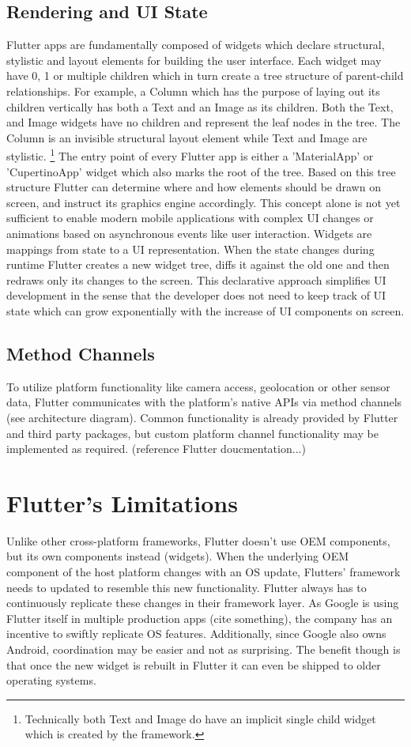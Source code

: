 \subsection{Rendering and UI State}
Flutter apps are fundamentally composed of widgets which declare structural, stylistic and layout elements for building the user interface. 
Each widget may have 0, 1 or multiple children which in turn create a tree structure of parent-child relationships. 
For example, a Column which has the purpose of laying out its children vertically has both a Text and an Image as its children. Both the Text,
and Image widgets have no children and represent the leaf nodes in the tree. The Column is an invisible structural layout element while Text and 
Image are stylistic.
\footnote{Technically both Text and Image do have an implicit single child widget which is created by the framework.}
The entry point of every Flutter app is either a 'MaterialApp' or 'CupertinoApp' widget which also marks the root of the tree.
Based on this tree structure Flutter can determine where and how elements should be drawn on screen, and instruct its graphics engine accordingly.
This concept alone is not yet sufficient to enable modern mobile applications with complex UI changes or animations 
based on asynchronous events like user interaction. 
Widgets are mappings from state to a UI representation. When the state changes during runtime Flutter creates a new widget tree, 
diffs it against the old one and then redraws only its changes to the screen.
This declarative approach simplifies UI development in the sense that the developer does not need to keep track of UI state which can grow exponentially
with the increase of UI components on screen. 

\subsection{Method Channels}
To utilize platform functionality like camera access, geolocation or other sensor data, Flutter communicates with the platform's native APIs via 
method channels (see architecture diagram). Common functionality is already provided by Flutter and third party packages, but custom platform channel
functionality may be implemented as required. (reference Flutter doucmentation...)

\section{Flutter's Limitations}
Unlike other cross-platform frameworks, Flutter doesn't use OEM components, but its own components instead (widgets).
When the underlying OEM component of the host platform changes with an OS update, Flutters' framework needs to updated to resemble this new 
functionality. Flutter always has to continuously replicate these changes in their framework layer. As Google is using Flutter itself in multiple 
production apps (cite something), the company has an incentive to swiftly replicate OS features. Additionally, since Google also owns Android, 
coordination may be easier and not as surprising.
The benefit though is that once the new widget is rebuilt in Flutter it can even be shipped to older operating systems.